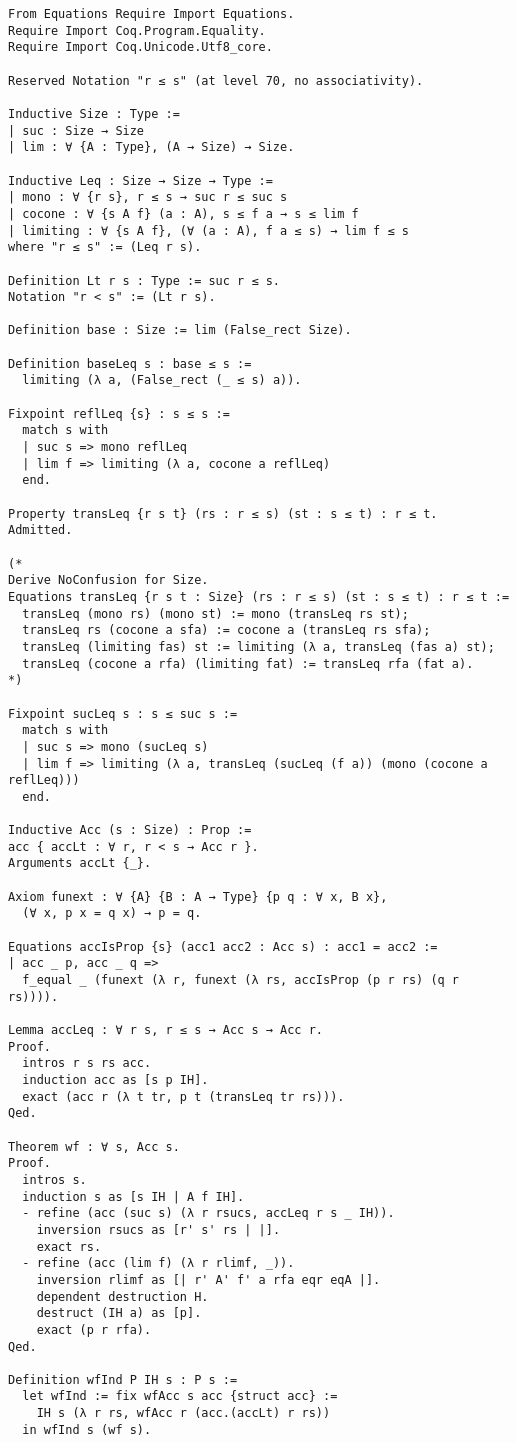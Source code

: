 \begin{singlespace}
\begin{verbatim}
From Equations Require Import Equations.
Require Import Coq.Program.Equality.
Require Import Coq.Unicode.Utf8_core.

Reserved Notation "r ≤ s" (at level 70, no associativity).

Inductive Size : Type :=
| suc : Size → Size
| lim : ∀ {A : Type}, (A → Size) → Size.

Inductive Leq : Size → Size → Type :=
| mono : ∀ {r s}, r ≤ s → suc r ≤ suc s
| cocone : ∀ {s A f} (a : A), s ≤ f a → s ≤ lim f
| limiting : ∀ {s A f}, (∀ (a : A), f a ≤ s) → lim f ≤ s
where "r ≤ s" := (Leq r s).

Definition Lt r s : Type := suc r ≤ s.
Notation "r < s" := (Lt r s).

Definition base : Size := lim (False_rect Size).

Definition baseLeq s : base ≤ s :=
  limiting (λ a, (False_rect (_ ≤ s) a)).

Fixpoint reflLeq {s} : s ≤ s :=
  match s with
  | suc s => mono reflLeq
  | lim f => limiting (λ a, cocone a reflLeq)
  end.

Property transLeq {r s t} (rs : r ≤ s) (st : s ≤ t) : r ≤ t.
Admitted.

(*
Derive NoConfusion for Size.
Equations transLeq {r s t : Size} (rs : r ≤ s) (st : s ≤ t) : r ≤ t :=
  transLeq (mono rs) (mono st) := mono (transLeq rs st);
  transLeq rs (cocone a sfa) := cocone a (transLeq rs sfa);
  transLeq (limiting fas) st := limiting (λ a, transLeq (fas a) st);
  transLeq (cocone a rfa) (limiting fat) := transLeq rfa (fat a).
*)

Fixpoint sucLeq s : s ≤ suc s :=
  match s with
  | suc s => mono (sucLeq s)
  | lim f => limiting (λ a, transLeq (sucLeq (f a)) (mono (cocone a reflLeq)))
  end.

Inductive Acc (s : Size) : Prop :=
acc { accLt : ∀ r, r < s → Acc r }.
Arguments accLt {_}.

Axiom funext : ∀ {A} {B : A → Type} {p q : ∀ x, B x},
  (∀ x, p x = q x) → p = q.

Equations accIsProp {s} (acc1 acc2 : Acc s) : acc1 = acc2 :=
| acc _ p, acc _ q =>
  f_equal _ (funext (λ r, funext (λ rs, accIsProp (p r rs) (q r rs)))).

Lemma accLeq : ∀ r s, r ≤ s → Acc s → Acc r.
Proof.
  intros r s rs acc.
  induction acc as [s p IH].
  exact (acc r (λ t tr, p t (transLeq tr rs))).
Qed.

Theorem wf : ∀ s, Acc s.
Proof.
  intros s.
  induction s as [s IH | A f IH].
  - refine (acc (suc s) (λ r rsucs, accLeq r s _ IH)).
    inversion rsucs as [r' s' rs | |].
    exact rs.
  - refine (acc (lim f) (λ r rlimf, _)).
    inversion rlimf as [| r' A' f' a rfa eqr eqA |].
    dependent destruction H.
    destruct (IH a) as [p].
    exact (p r rfa).
Qed.

Definition wfInd P IH s : P s :=
  let wfInd := fix wfAcc s acc {struct acc} :=
    IH s (λ r rs, wfAcc r (acc.(accLt) r rs))
  in wfInd s (wf s).
\end{verbatim}
\end{singlespace}


